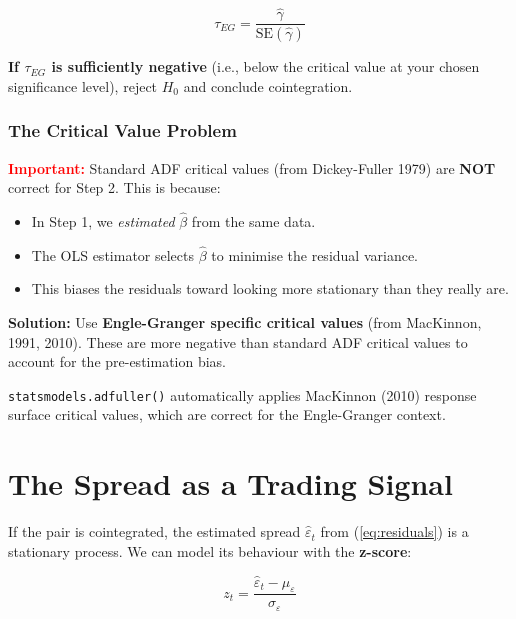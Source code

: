 \documentclass[12pt, a4paper]{article}
\begin{document}
\begin{equation}
    \tau_{EG} = \frac{\hat\gamma}{\text{SE}(\hat\gamma)}
\end{equation}

\textbf{If $\tau_{EG}$ is sufficiently negative} (i.e., below the critical value at your chosen significance level), 
reject $H_0$ and conclude cointegration.

\subsubsection{The Critical Value Problem}

\textcolor{red}{\textbf{Important:}} Standard ADF critical values (from Dickey-Fuller 1979) 
are \textbf{NOT} correct for Step 2. This is because:

\begin{itemize}
    \item In Step 1, we \emph{estimated} $\hat\beta$ from the same data.
    \item The OLS estimator selects $\hat\beta$ to minimise the residual variance.
    \item This biases the residuals toward looking more stationary than they really are.
\end{itemize}

\textbf{Solution:} Use \textbf{Engle-Granger specific critical values} (from MacKinnon, 1991, 2010). 
These are more negative than standard ADF critical values to account for the pre-estimation bias.

\texttt{statsmodels.adfuller()} automatically applies MacKinnon (2010) response surface 
critical values, which are correct for the Engle-Granger context.

\section{The Spread as a Trading Signal}

If the pair is cointegrated, the estimated spread $\hat\varepsilon_t$ from (\ref{eq:residuals}) 
is a stationary process. We can model its behaviour with the \textbf{z-score}:

\begin{equation}
    z_t = \frac{\hat\varepsilon_t - \mu_\varepsilon}{\sigma_\varepsilon}
    \label{eq:zscore}
\end{equation}
\end{document}
